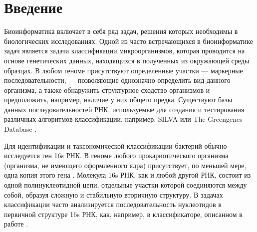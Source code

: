 \documentclass[14pt]{matmex-diploma}
\begin{document}
\maketitle
\tableofcontents
\section*{Введение}
Биоинформатика включает в себя ряд задач, решения которых необходимы в биологических исследованиях. Одной из часто встречающихся в биоинформатике задач является задача классификации микроорганизмов, которая проводится на основе генетических данных, находящихся в полученных из окружающей среды образцах. В любом геноме присутствуют определенные участки --- маркерные последовательности, --- позволяющие однозначно определить вид данного организма, а также обнаружить структурное сходство организмов и предположить, например, наличие у них общего предка. Существуют базы данных последовательностей РНК, используемые для создания и тестирования различных алгоритмов классификации, например, SILVA \cite{5} или The Greengenes Database \cite{14}.

Для идентификации и таксономической классификации бактерий обычно исследуется ген 16s РНК. В геноме любого прокариотического организма (организма, не имеющего оформленного ядра) присутствует, по меньшей мере, одна копия этого гена \cite{1}. Молекула 16s РНК, как и  любой другой РНК, состоит из одной полинуклеотидной цепи, отдельные участки которой соединяются между собой, образуя сложную и стабильную вторичную структуру. В задачах классификации часто анализируется последовательность нуклеотидов в первичной структуре 16s РНК, как, например, в классификаторе, описанном в работе \cite{2}. 
\end{document}
